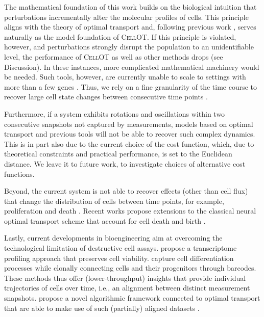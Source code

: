 The mathematical foundation of this work builds on the biological intuition that perturbations incrementally alter the molecular profiles of cells. This principle aligns with the theory of optimal transport and, following previous work \citep{schiebinger2019optimal}, serves naturally as the model foundation of \textsc{CellOT}.
If this principle is violated, however, and perturbations strongly disrupt the population to an unidentifiable level, the performance of \textsc{CellOT} as well as other methods drops (see Discussion).
In these instances, more complicated mathematical machinery would be needed.
Such tools, however, are currently unable to scale to settings with more than a few genes \citep{heydari2022iqcell}.
Thus, we rely on a fine granularity of the time course to recover large cell state changes between consecutive time points \citep{tritschler2019concepts}.

Furthermore, if a system exhibits rotations and oscillations within two consecutive snapshots not captured by measurements, models based on optimal transport and previous tools \citep{weinreb2018fundamental} will not be able to recover such complex dynamics. This is in part also due to the current choice of the cost function, which, due to theoretical constraints and practical performance, is set to the Euclidean distance. We leave it to future work, to investigate choices of alternative cost functions. 

Beyond, the current system is not able to recover effects (other than cell flux) that change the distribution of cells between time points, for example, proliferation and death \citep{tritschler2019concepts}. Recent works propose extensions to the classical neural optimal transport scheme that account for cell death and birth \citep{lubeck2022neural}.

Lastly, current developments in bioengineering aim at overcoming the technological limitation of destructive cell assays. \citet{chen2022live} propose a transcriptome profiling approach that preserves cell viability. \citet{weinreb2020lineage} capture cell differentiation processes while clonally connecting cells and their progenitors through barcodes. These methods thus offer (lower-throughput) insights that provide individual trajectories of cells over time, i.e., an alignment between distinct measurement snapshots.
\citet{somnath2023aligned} propose a novel algorithmic framework connected to optimal transport that are able to make use of such (partially) aligned datasets \citep{shi2023diffusion, tong2023conditional}. 
